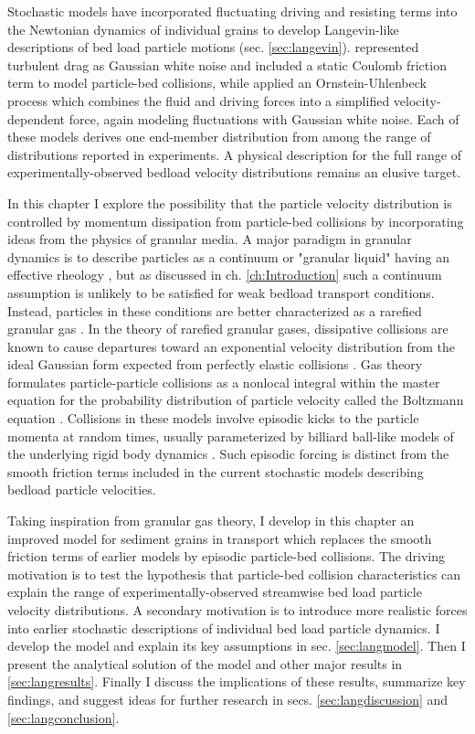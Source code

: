 Stochastic models have incorporated fluctuating driving and resisting terms into the Newtonian dynamics of individual grains to develop Langevin-like descriptions of bed load particle motions (sec. \ref{sec:langevin}). \citet{Fan2014} represented turbulent drag as Gaussian white noise and included a static Coulomb friction term to model particle-bed collisions, while \citet{Ancey2014} applied an Ornstein-Uhlenbeck process which combines the fluid and driving forces into a simplified velocity-dependent force, again modeling fluctuations with Gaussian white noise.
Each of these models derives one end-member distribution from among the range of distributions reported in experiments.
A physical description for the full range of experimentally-observed bedload velocity distributions remains an elusive target.

In this chapter I explore the possibility that the particle velocity distribution is controlled by momentum dissipation from particle-bed collisions by incorporating ideas from the physics of granular media.
A major paradigm in granular dynamics is to describe particles as a continuum or "granular liquid" having an effective rheology \citep[e.g.][]{Jenkins1998,Andreotti2013}, but as discussed in ch. \ref{ch:Introduction} such a continuum assumption is unlikely to be satisfied for weak bedload transport conditions. Instead, particles in these conditions are better characterized as a rarefied granular gas \citep[e.g.][]{Furbish2021}. 
In the theory of rarefied granular gases, dissipative collisions are known to cause departures toward an exponential velocity distribution from the ideal Gaussian form expected from perfectly elastic collisions \citep{Brilliantov2004}.
Gas theory formulates particle-particle collisions as a nonlocal integral within the master equation for the probability distribution of particle velocity called the Boltzmann equation \citep{Landau1969,Chapman1970,Briliantov2004}.
Collisions in these models involve episodic kicks to the particle momenta at random times, usually parameterized by billiard ball-like models of the underlying rigid body dynamics \citep[e.g.][]{Brach1989}.
Such episodic forcing is distinct from the smooth friction terms included in the current stochastic models describing bedload particle velocities.

Taking inspiration from granular gas theory, I develop in this chapter an improved model for sediment grains in transport which replaces the smooth friction terms of earlier models by episodic particle-bed collisions.
The driving motivation is to test the hypothesis that particle-bed collision characteristics can explain the range of experimentally-observed streamwise bed load particle velocity distributions.
A secondary motivation is to introduce more realistic forces into earlier stochastic descriptions of individual bed load particle dynamics. 
I develop the model and explain its key assumptions in sec. \ref{sec:langmodel}. Then I present the analytical solution of the model and other major results in \ref{sec:langresults}. Finally I discuss the implications of these results, summarize key findings, and suggest ideas for further research in secs. \ref{sec:langdiscussion} and \ref{sec:langconclusion}.


